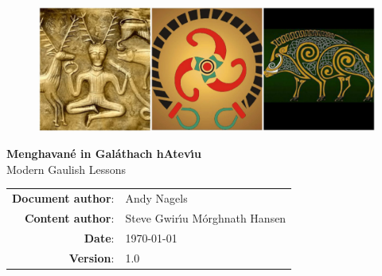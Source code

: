 \begin{titlepage}
  \thispagestyle{empty} %
  \vspace*{\fill}

  \begin{center}

    \begin{figure}[H]
    \centering
    \includegraphics[width=16.0cm]{img/triple-image-banner.eps}
    \end{figure}

    \textbf{\Huge Menghavan\'{e} in Gal\'{a}thach hAtev\'{\i}u}\\
    {\huge Modern Gaulish Lessons}\\
    
    \vspace{\fill}

    \begin{table}[H]
    \centering
    \begin{tabu}{rl}
      \textbf{Document author}: & Andy Nagels\\
      \textbf{Content author}: & Steve Gwir\'{\i}u M\'{o}rghnath Hansen\\
      \textbf{Date}: & \today\\
      \textbf{Version}: & 1.0
    \end{tabu}
    \label{titlepage_info}
    \end{table}

  \end{center}

  \vspace*{\fill}

\end{titlepage}
